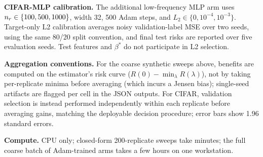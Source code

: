 \textbf{CIFAR-MLP calibration.} The additional low-frequency MLP arm uses $n_r\in\{100,500,1000\}$, width 32, 500 Adam steps, and $L_2\in\{0,10^{-4},10^{-3}\}$. Target-only L2 calibration averages noisy validation-label MSE over two seeds, using the same 80/20 split convention, and final test risks are reported over five evaluation seeds. Test features and $\beta^*$ do not participate in L2 selection.

\textbf{Aggregation conventions.} For the coarse synthetic sweeps above, benefits are computed on the estimator's risk curve ($R(0)-\min_\lambda R(\lambda)$), not by taking per-replicate minima before averaging (which incurs a Jensen bias); single-seed artifacts are flagged per cell in the JSON outputs. For CIFAR, validation selection is instead performed independently within each replicate before averaging gains, matching the deployable decision procedure; error bars show 1.96 standard errors.

\textbf{Compute.} CPU only; closed-form 200-replicate sweeps take minutes; the full coarse batch of Adam-trained arms takes a few hours on one workstation.
